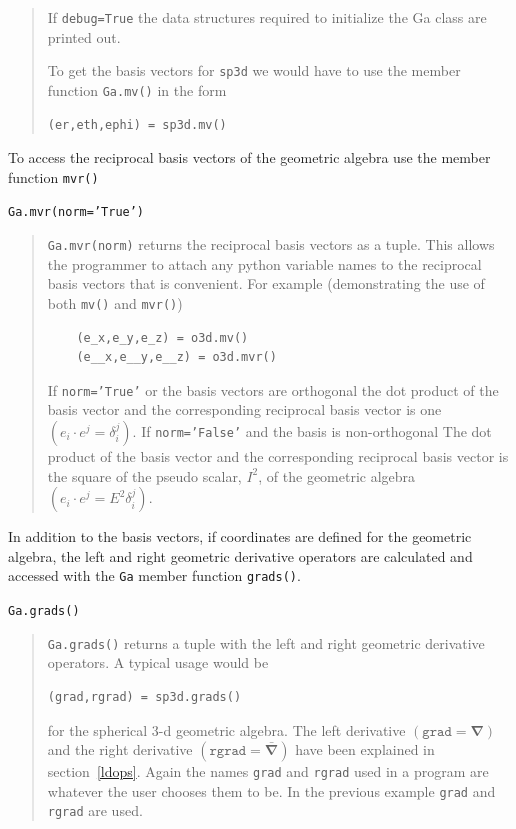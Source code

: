 \documentclass[12pt]{report}
\newcommand{\bm}[1]{\boldsymbol{#1}}
\newcommand{\lp}{\left (}
\newcommand{\rp}{\right )}
\newcommand{\paren}[1]{\lp {#1} \rp}
\newcommand{\T}[1]{\texttt{#1}}
\begin{document}
\begin{quote}
   If \T{debug=True} the data structures required to initialize the Ga class
   are printed out.

   To get the basis vectors for \T{sp3d} we would have to use the member function
   \T{Ga.mv()} in the form
   \begin{lstlisting}[numbers=none]
    (er,eth,ephi) = sp3d.mv()
   \end{lstlisting}
\end{quote}

To access the reciprocal basis vectors of the geometric algebra use the member function \T{mvr()}

\T{Ga.mvr(norm='True')}
\begin{quote}
    \T{Ga.mvr(norm)} returns the reciprocal basis vectors as a tuple.  This allows the programmer to
    attach any python variable names to the reciprocal basis vectors that is convenient. For example
    (demonstrating the use of both \T{mv()} and \T{mvr()})
   \begin{lstlisting}
    (e_x,e_y,e_z) = o3d.mv()
    (e__x,e__y,e__z) = o3d.mvr()
    \end{lstlisting}
    If \T{norm='True'} or the basis vectors are orthogonal
    the dot product of the basis vector and the corresponding reciprocal basis vector is one
    $\paren{e_{i}\cdot e^{j}=\delta_{i}^{j}}$.  If \T{norm='False'} and the basis is non-orthogonal
    The dot product of the basis vector and the corresponding reciprocal basis vector is the square of the
    pseudo scalar, $I^{2}$, of the geometric algebra $\paren{e_{i}\cdot e^{j}=E^{2}\delta_{i}^{j}}$.
\end{quote}

In addition to the basis vectors, if coordinates are defined for the geometric algebra, the
left and right geometric derivative operators are calculated and accessed with the \T{Ga}
member function \T{grads()}.

\T{Ga.grads()}
\begin{quote}
    \T{Ga.grads()} returns a tuple with the left and right geometric derivative operators. A
    typical usage would be
    \begin{lstlisting}[numbers=none]
    (grad,rgrad) = sp3d.grads()
    \end{lstlisting}
    for the spherical 3-d geometric algebra. The left derivative $\paren{\T{grad} =\bm{\nabla}}$ and the
    right derivative $\paren{\T{rgrad} = \bm{\bar{\nabla}}}$ have been explained in section~\ref{ldops}. Again
    the names \T{grad} and \T{rgrad} used in a program are whatever the user chooses them to be.  In the previous
    example \T{grad} and \T{rgrad} are used.
\end{quote}
\end{document}
